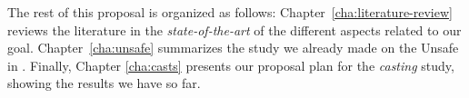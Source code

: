 The rest of this proposal is organized as follows:
Chapter~\ref{cha:literature-review} reviews the literature in the \emph{state-of-the-art} of the different aspects related to our goal.
Chapter~\ref{cha:unsafe} summarizes the study we already made on the Unsafe \api{} in \java{}.
Finally, Chapter \ref{cha:casts} presents our proposal plan for the \emph{casting} study, showing the results we have so far.